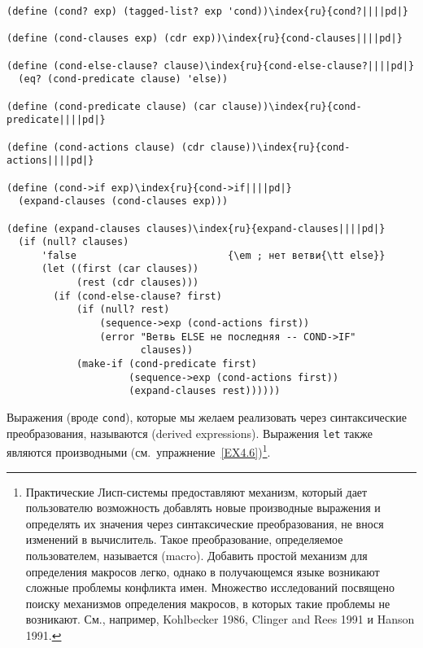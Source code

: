 \begin{Verbatim}[fontsize=\small]
(define (cond? exp) (tagged-list? exp 'cond))\index{ru}{cond?||||pd|}

(define (cond-clauses exp) (cdr exp))\index{ru}{cond-clauses||||pd|}

(define (cond-else-clause? clause)\index{ru}{cond-else-clause?||||pd|}
  (eq? (cond-predicate clause) 'else))

(define (cond-predicate clause) (car clause))\index{ru}{cond-predicate||||pd|}

(define (cond-actions clause) (cdr clause))\index{ru}{cond-actions||||pd|}

(define (cond->if exp)\index{ru}{cond->if||||pd|}
  (expand-clauses (cond-clauses exp)))

(define (expand-clauses clauses)\index{ru}{expand-clauses||||pd|}
  (if (null? clauses)
      'false                          {\em ; нет ветви{\tt else}}
      (let ((first (car clauses))
            (rest (cdr clauses)))
        (if (cond-else-clause? first)
            (if (null? rest)
                (sequence->exp (cond-actions first))
                (error "Ветвь ELSE не последняя -- COND->IF"
                       clauses))
            (make-if (cond-predicate first)
                     (sequence->exp (cond-actions first))
                     (expand-clauses rest))))))
\end{Verbatim}

Выражения (вроде {\tt cond}), которые мы желаем
реализовать через синтаксические преобразования, называются 
 (derived expressions). Выражения
{\tt let} также являются производными 
(см.~упражнение~\ref{EX4.6})\footnote{Практические
Лисп-системы предоставляют механизм, который
дает пользователю возможность добавлять новые производные выражения и
определять их значения через синтаксические преобразования,
не внося изменений в вычислитель.  Такое преобразование, определяемое
пользователем, называется 
(macro).  Добавить простой механизм для определения макросов легко,
однако в получающемся языке возникают сложные проблемы конфликта
имен.  Множество исследований посвящено поиску механизмов
определения макросов, в которых такие проблемы не возникают. См.,
например,
Kohlbecker 1986, Clinger and Rees 1991
и Hanson 1991.}.


